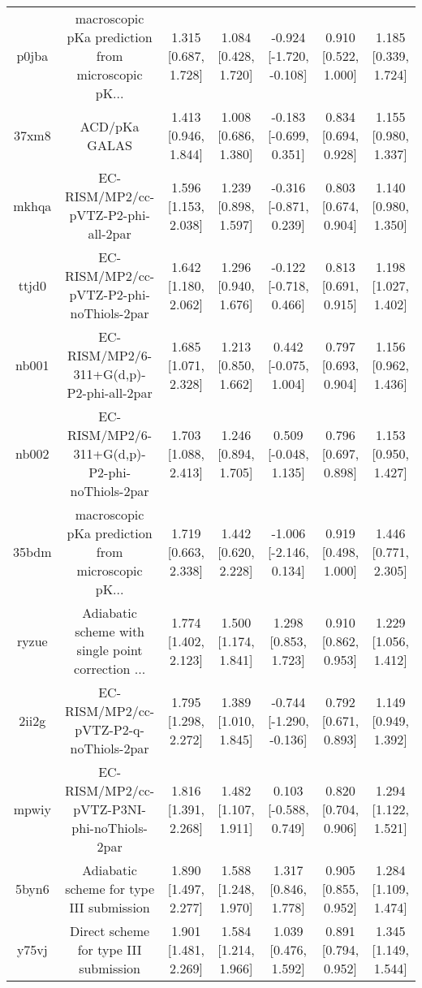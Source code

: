 \documentclass{article}
\begin{document}
\begin{center}
\begin{longtable}{|ccccccc|}
 p0jba &  macroscopic pKa prediction from microscopic pK... &  1.315 [0.687, 1.728] &  1.084 [0.428, 1.720] &  -0.924 [-1.720, -0.108] &  0.910 [0.522, 1.000] &   1.185 [0.339, 1.724] \\
 37xm8 &                                      ACD/pKa GALAS &  1.413 [0.946, 1.844] &  1.008 [0.686, 1.380] &   -0.183 [-0.699, 0.351] &  0.834 [0.694, 0.928] &   1.155 [0.980, 1.337] \\
 mkhqa &                EC-RISM/MP2/cc-pVTZ-P2-phi-all-2par &  1.596 [1.153, 2.038] &  1.239 [0.898, 1.597] &   -0.316 [-0.871, 0.239] &  0.803 [0.674, 0.904] &   1.140 [0.980, 1.350] \\
 ttjd0 &           EC-RISM/MP2/cc-pVTZ-P2-phi-noThiols-2par &  1.642 [1.180, 2.062] &  1.296 [0.940, 1.676] &   -0.122 [-0.718, 0.466] &  0.813 [0.691, 0.915] &   1.198 [1.027, 1.402] \\
 nb001 &           EC-RISM/MP2/6-311+G(d,p)-P2-phi-all-2par &  1.685 [1.071, 2.328] &  1.213 [0.850, 1.662] &    0.442 [-0.075, 1.004] &  0.797 [0.693, 0.904] &   1.156 [0.962, 1.436] \\
 nb002 &      EC-RISM/MP2/6-311+G(d,p)-P2-phi-noThiols-2par &  1.703 [1.088, 2.413] &  1.246 [0.894, 1.705] &    0.509 [-0.048, 1.135] &  0.796 [0.697, 0.898] &   1.153 [0.950, 1.427] \\
 35bdm &  macroscopic pKa prediction from microscopic pK... &  1.719 [0.663, 2.338] &  1.442 [0.620, 2.228] &   -1.006 [-2.146, 0.134] &  0.919 [0.498, 1.000] &   1.446 [0.771, 2.305] \\
 ryzue &  Adiabatic scheme with single point correction ... &  1.774 [1.402, 2.123] &  1.500 [1.174, 1.841] &     1.298 [0.853, 1.723] &  0.910 [0.862, 0.953] &   1.229 [1.056, 1.412] \\
 2ii2g &             EC-RISM/MP2/cc-pVTZ-P2-q-noThiols-2par &  1.795 [1.298, 2.272] &  1.389 [1.010, 1.845] &  -0.744 [-1.290, -0.136] &  0.792 [0.671, 0.893] &   1.149 [0.949, 1.392] \\
 mpwiy &         EC-RISM/MP2/cc-pVTZ-P3NI-phi-noThiols-2par &  1.816 [1.391, 2.268] &  1.482 [1.107, 1.911] &    0.103 [-0.588, 0.749] &  0.820 [0.704, 0.906] &   1.294 [1.122, 1.521] \\
 5byn6 &           Adiabatic scheme for type III submission &  1.890 [1.497, 2.277] &  1.588 [1.248, 1.970] &     1.317 [0.846, 1.778] &  0.905 [0.855, 0.952] &   1.284 [1.109, 1.474] \\
 y75vj &              Direct scheme for type III submission &  1.901 [1.481, 2.269] &  1.584 [1.214, 1.966] &     1.039 [0.476, 1.592] &  0.891 [0.794, 0.952] &   1.345 [1.149, 1.544] \\

\end{longtable}
\end{center}
\end{document}
